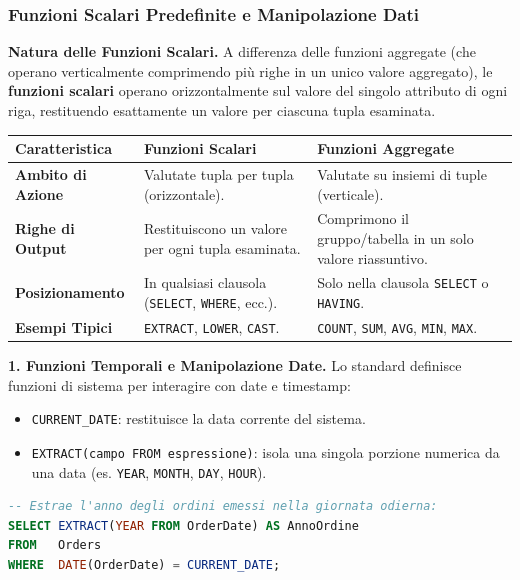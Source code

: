 \documentclass[12pt]{extarticle}
\begin{document}
\subsubsection{Funzioni Scalari Predefinite e Manipolazione Dati}
\noindent \textbf{Natura delle Funzioni Scalari.} A differenza delle funzioni aggregate (che operano verticalmente comprimendo più righe in un unico valore aggregato), le \textbf{funzioni scalari} operano orizzontalmente sul valore del singolo attributo di ogni riga, restituendo esattamente un valore per ciascuna tupla esaminata.

\begin{center}
\small
\begin{tabular}{lp{6.2cm}p{6.2cm}}
    \toprule
    \textbf{Caratteristica} & \textbf{Funzioni Scalari} & \textbf{Funzioni Aggregate} \\
    \midrule
    \textbf{Ambito di Azione} & Valutate tupla per tupla (orizzontale). & Valutate su insiemi di tuple (verticale). \\
    \addlinespace
    \textbf{Righe di Output} & Restituiscono un valore per ogni tupla esaminata. & Comprimono il gruppo/tabella in un solo valore riassuntivo. \\
    \addlinespace
    \textbf{Posizionamento} & In qualsiasi clausola (\texttt{SELECT}, \texttt{WHERE}, ecc.). & Solo nella clausola \texttt{SELECT} o \texttt{HAVING}. \\
    \addlinespace
    \textbf{Esempi Tipici} & \texttt{EXTRACT}, \texttt{LOWER}, \texttt{CAST}. & \texttt{COUNT}, \texttt{SUM}, \texttt{AVG}, \texttt{MIN}, \texttt{MAX}. \\
    \bottomrule
\end{tabular}
\end{center}

\medskip
\noindent \textbf{1. Funzioni Temporali e Manipolazione Date.} Lo standard definisce funzioni di sistema per interagire con date e timestamp:
\begin{itemize}
    \item \texttt{CURRENT\_DATE}: restituisce la data corrente del sistema.
    \item \texttt{EXTRACT(campo FROM espressione)}: isola una singola porzione numerica da una data (es. \texttt{YEAR}, \texttt{MONTH}, \texttt{DAY}, \texttt{HOUR}).
\end{itemize}

\begin{lstlisting}[language=SQL, caption={Uso di EXTRACT e CURRENT\_DATE}]
-- Estrae l'anno degli ordini emessi nella giornata odierna:
SELECT EXTRACT(YEAR FROM OrderDate) AS AnnoOrdine
FROM   Orders
WHERE  DATE(OrderDate) = CURRENT_DATE;
\end{lstlisting}
\end{document}

